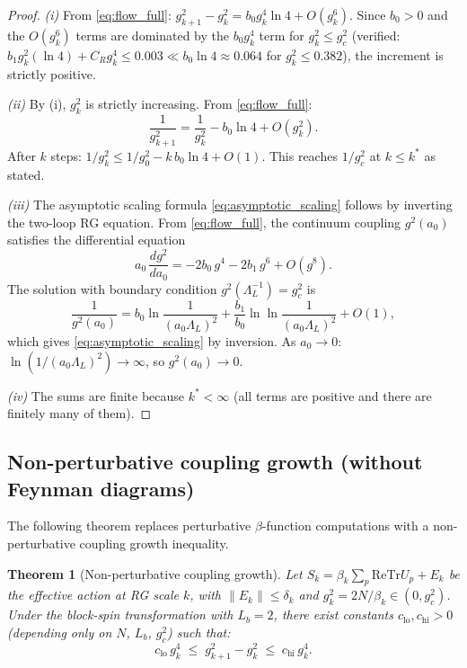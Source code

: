 \documentclass[11pt,a4paper]{amsart}
\newtheorem{theorem}{Theorem}[section]
\theoremstyle{definition}
\newcommand{\re}{\mathrm{Re}}
\newcommand{\Tr}{\mathrm{Tr}}
\newcommand{\gB}{g^2_c}
\begin{document}
\begin{proof}
\emph{(i)} From \eqref{eq:flow_full}: $g^2_{k+1} - g^2_k = b_0 g^4_k \ln 4
+ O(g^6_k)$.  Since $b_0 > 0$ and the $O(g^6_k)$ terms are dominated by the
$b_0 g^4_k$ term for $g^2_k \le \gB$ (verified: $b_1 g^2_k (\ln 4) + C_R g^4_k
\le 0.003 \ll b_0 \ln 4 \approx 0.064$ for $g^2_k \le 0.382$), the increment is
strictly positive.

\emph{(ii)} By (i), $g^2_k$ is strictly increasing.  From \eqref{eq:flow_full}:
\[
  \frac{1}{g^2_{k+1}} = \frac{1}{g^2_k} - b_0\ln 4 + O(g^2_k).
\]
After $k$ steps: $1/g^2_k \le 1/g^2_0 - k\,b_0\ln 4 + O(1)$.
This reaches $1/\gB$ at $k \le k^*$ as stated.

\emph{(iii)} The asymptotic scaling formula \eqref{eq:asymptotic_scaling}
follows by inverting the two-loop RG equation.  From \eqref{eq:flow_full},
the continuum coupling $g^2(a_0)$ satisfies the differential equation
\[
  a_0\,\frac{dg^2}{da_0} = -2b_0\,g^4 - 2b_1\,g^6 + O(g^8).
\]
The solution with boundary condition $g^2(\Lambda_L^{-1}) = \gB$ is
\[
  \frac{1}{g^2(a_0)} = b_0\ln\frac{1}{(a_0\Lambda_L)^2}
  + \frac{b_1}{b_0}\ln\ln\frac{1}{(a_0\Lambda_L)^2} + O(1),
\]
which gives \eqref{eq:asymptotic_scaling} by inversion.
As $a_0\to 0$: $\ln(1/(a_0\Lambda_L)^2) \to \infty$, so $g^2(a_0)\to 0$.

\emph{(iv)} The sums are finite because $k^* < \infty$ (all terms are
positive and there are finitely many of them). \qedhere
\end{proof}

\subsection{Non-perturbative coupling growth (without Feynman diagrams)}
\label{sec:nonpert_growth}

The following theorem replaces perturbative $\beta$-function computations
with a non-perturbative coupling growth inequality.

\begin{theorem}[Non-perturbative coupling growth]
\label{thm:nonpert_growth}
Let $S_k = \beta_k \sum_p \re\Tr U_p + E_k$ be the effective action at
RG scale $k$, with $\|E_k\| \le \delta_k$ and $g^2_k = 2N/\beta_k \in (0,\gB)$.
Under the block-spin transformation with $L_b = 2$, there exist constants
$c_{\mathrm{lo}}, c_{\mathrm{hi}} > 0$ (depending only on $N$, $L_b$, $\gB$) such that:
\begin{equation}\label{eq:nonpert_ineq}
  c_{\mathrm{lo}}\,g^4_k
  \;\le\;
  g^2_{k+1} - g^2_k
  \;\le\;
  c_{\mathrm{hi}}\,g^4_k.
\end{equation}
\end{theorem}
\end{document}
